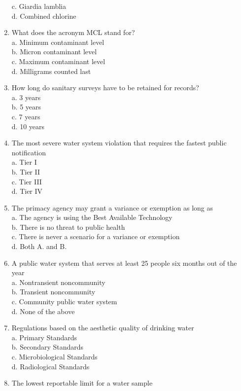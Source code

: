 \begin{enumerate}[1.]
c. Giardia lamblia\\
d. Combined chlorine\\
\item What does the acronym MCL stand for?\\
a. Minimum contaminant level\\
b. Micron contaminant level\\
c. Maximum contaminant level\\
d. Milligrams counted last\\
\item How long do sanitary surveys have to be retained for records?\\
a. 3 years\\
b. 5 years\\
c. 7 years\\
d. 10 years\\
\item The most severe water system violation that requires the fastest public notification\\
a. Tier I\\
b. Tier II\\
c. Tier III\\
d. Tier IV
\item The primacy agency may grant a variance or exemption as long as\\
a. The agency is using the Best Available Technology\\
b. There is no threat to public health\\
c. There is never a scenario for a variance or exemption\\
d. Both A. and B.\\
\item A public water system that serves at least 25 people six months out of the year\\
a. Nontransient noncommunity\\
b. Transient noncommunity\\
c. Community public water system\\
d. None of the above\\
\item Regulations based on the aesthetic quality of drinking water\\
a. Primary Standards\\
b. Secondary Standards\\
c. Microbiological Standards\\
d. Radiological Standards\\
\item The lowest reportable limit for a water sample\\

\end{enumerate}
